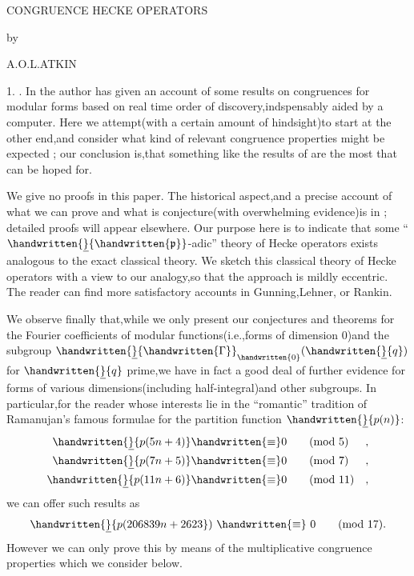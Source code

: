 \begin{center}
CONGRUENCE HECKE OPERATORS

by

A.O.L.ATKIN
\end{center}

1. . \quad In  the author has given an account of some results on congruences for modular forms based on real time order of discovery,indspensably aided by a computer. Here we attempt(with a certain amount of hindsight)to start at the other end,and consider what kind of relevant congruence properties might be expected   ; our conclusion is,that something like the results of  are the most that can be hoped for.

We give no proofs in this paper. The historical aspect,and a precise account of what we can prove and what is conjecture(with overwhelming evidence)is in ; detailed proofs will appear elsewhere. Our purpose here is to indicate that some \reversemarginpar{}\normalmarginpar``$\handwritten{\underline}{\handwritten{\mathfrak{p}}}$-adic'' theory of Hecke operators exists analogous to the exact classical theory. We sketch this classical theory of Hecke operators with a view to our analogy,so that the approach is mildly eccentric. The reader can find more satisfactory accounts in Gunning,Lehner, or Rankin.

We observe finally that,while we only present our conjectures and theorems for the Fourier coefficients of modular functions(i.e.,forms of dimension $0$)and the subgroup $\handwritten{\underline}{\handwritten{\Gamma}}_{\handwritten{0}}(\handwritten{\underline}{q})$ for $\handwritten{\underline}{q}$ prime,we have in fact a good deal of further evidence for forms of various dimensions(including half-integral)and other subgroups. In particular,for the reader whose interests lie in the ``romantic'' tradition of Ramanujan's famous formulae for the partition function $\handwritten{\underline}{p(n)}$:
\[
\begin{aligned}
\handwritten{\underline}{p(5n+4)}  &\handwritten{\equiv} 0 \qquad (\mathrm{mod}\ 5)  &,\\
\handwritten{\underline}{p(7n+5)}  &\handwritten{\equiv} 0 \qquad (\mathrm{mod}\ 7)  &,\\
\handwritten{\underline}{p(11n+6)} &\handwritten{\equiv} 0 \qquad (\mathrm{mod}\ 11) &,
\end{aligned}
\]
we can offer such results as
\[
\handwritten{\underline}{p(206839n+2623})\ \handwritten{\equiv}\ 0 \qquad (\mathrm{mod}\ 17).
\]
However we can only prove this by means of the multiplicative congruence properties which we consider below.

